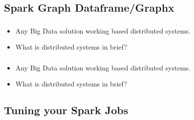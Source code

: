 
\subsection{Spark Graph Dataframe/Graphx}

\begin{frame}
  \frametitle{\subsecname}
	\begin{itemize}[<+->]
		\item Any Big Data solution working based distributed systems.
		\item What is distributed systems in brief?
	\end{itemize}
\end{frame}


\begin{frame}
  \frametitle{\subsecname}
	\begin{itemize}[<+->]
		\item Any Big Data solution working based distributed systems.
		\item What is distributed systems in brief?
	\end{itemize}
\end{frame}



\subsection{Tuning your Spark Jobs}


